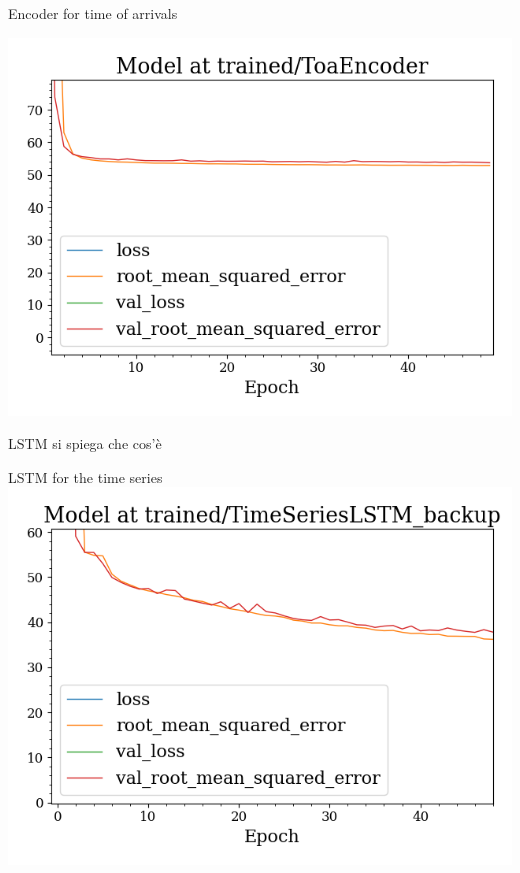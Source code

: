 \documentclass{beamer}
\begin{document}
\begin{frame}{Encoder for time of arrivals}

    \includegraphics[width=\textwidth]{ENC_history.png}
    
\end{frame}


\begin{frame}{LSTM}
si spiega che cos'è
    
\end{frame}

\begin{frame}{LSTM for the time series}
    \includegraphics[width=\textwidth]{LSTM_history.png}    
\end{frame}
\end{document}
